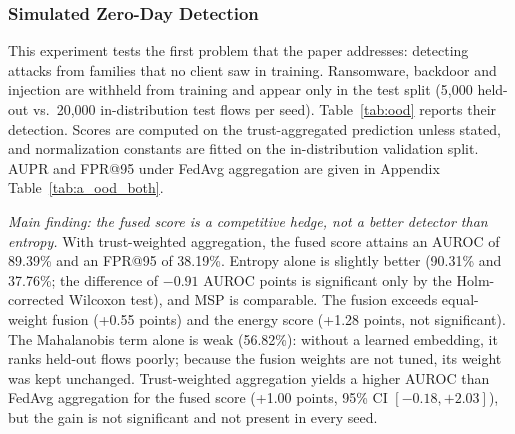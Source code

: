 \documentclass[pdflatex,sn-mathphys-num]{sn-jnl}
\begin{document}
{{\subsubsection{Simulated Zero-Day Detection}\label{sec:ood}
This experiment tests the first problem that the paper addresses: detecting attacks from families that no client saw in training. Ransomware, backdoor and injection are withheld from training and appear only in the test split (5{,}000 held-out vs.\ 20{,}000 in-distribution test flows per seed). Table~\ref{tab:ood} reports their detection. Scores are computed on the trust-aggregated prediction unless stated, and normalization constants are fitted on the in-distribution validation split. AUPR and FPR@95 under FedAvg aggregation are given in Appendix Table~\ref{tab:a_ood_both}.

\begin{table}[!htbp]\centering
\color{black}
\caption{Simulated zero-day detection on TON-IoT, three attack families withheld, moderate noise (mean $\pm$ std over ten seeds).}\label{tab:ood}
\footnotesize
\setlength{\tabcolsep}{4pt}
\end{table}

\emph{Main finding: the fused score is a competitive hedge, not a better detector than entropy.} With trust-weighted aggregation, the fused score attains an AUROC of 89.39\% and an FPR@95 of 38.19\%. Entropy alone is slightly better (90.31\% and 37.76\%; the difference of $-0.91$ AUROC points is significant only by the Holm-corrected Wilcoxon test), and MSP is comparable. The fusion exceeds equal-weight fusion (+0.55 points) and the energy score (+1.28 points, not significant). The Mahalanobis term alone is weak (56.82\%): without a learned embedding, it ranks held-out flows poorly; because the fusion weights are not tuned, its weight was kept unchanged. Trust-weighted aggregation yields a higher AUROC than FedAvg aggregation for the fused score (+1.00 points, 95\% CI $[-0.18,+2.03]$), but the gain is not significant and not present in every seed.

}}
\end{document}
